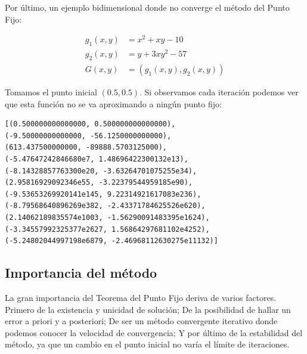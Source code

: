 Por último, un ejemplo bidimensional donde no converge el método del Punto Fijo:
\begin{example}
$$
\begin{matrix}
	g_1(x,y) & = x^2+xy-10 \\
	g_2(x,y) & = y + 3xy^2 - 57 \\
	G(x,y)   & = (g_1(x,y),g_2(x,y))
\end{matrix}
$$

Tomamos el punto inicial $(0.5,0.5)$. Si observamos cada iteración podemos ver que esta función no se va aproximando a ningún punto fijo:

\begin{verbatim}
[(0.500000000000000, 0.500000000000000),
(-9.50000000000000, -56.1250000000000),
(613.437500000000, -89888.5703125000),
(-5.47647242846680e7, 1.48696422300132e13),
(-8.14328857763300e20, -3.63264701075255e34),
(2.95816929092346e55, -3.22379544959185e90),
(-9.53653269920141e145, 9.22314921617083e236),
(-8.79568640896269e382, -2.43371784625526e620),
(2.14062189835574e1003, -1.56290091483395e1624),
(-3.34557992325377e2627, 1.56864297681102e4252),
(-5.24802044997198e6879, -2.46968112630275e11132)]
\end{verbatim}

	
\end{example}
                                           
%

\subsection{Importancia del método}

La gran importancia del Teorema del Punto Fijo deriva de varios factores. Primero de la existencia y unicidad de solución; De la posibilidad de hallar un error a priori y a posteriori; De ser un método convergente iterativo donde podemos conocer la velocidad de convergencia; Y por último de la estabilidad del método, ya que un cambio en el punto inicial no varía el límite de iteraciones.

